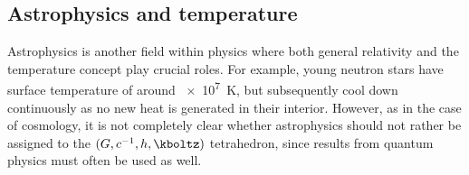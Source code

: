 \subsection*{Astrophysics and temperature}

Astrophysics is another field within physics where both general relativity and the temperature concept play crucial roles. For example, young neutron stars have surface temperature of around \qty{e7}{\kelvin}, but subsequently cool down continuously as no new heat is generated in their interior. However, as in the case of cosmology, it is not completely clear whether astrophysics should not rather be assigned to the $(G,c^{-1},h,\kboltz)$ tetrahedron, since results from quantum physics must often be used as well.

